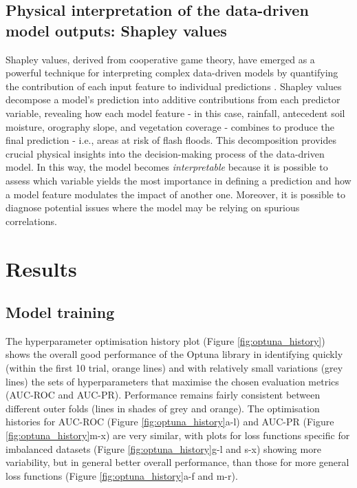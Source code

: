 \subsection{Physical interpretation of the data-driven model outputs: Shapley values}

Shapley values, derived from cooperative game theory, have emerged as a powerful technique for interpreting complex data-driven models by quantifying the contribution of each input feature to individual predictions \citep{Rozemberczki_2022}. Shapley values decompose a model's prediction into additive contributions from each predictor variable, revealing how each model feature - in this case, rainfall, antecedent soil moisture, orography slope, and vegetation coverage - combines to produce the final prediction - i.e., areas at risk of flash floods. This decomposition provides crucial physical insights into the decision-making process of the data-driven model. In this way, the model becomes \textit{interpretable} because it is possible to assess which variable yields the most importance in defining a prediction and how a model feature modulates the impact of another one. Moreover, it is possible to diagnose potential issues where the model may be relying on spurious correlations.  


\section{Results}
\label{data_driven_flash_floods_short_medium_range_results}

\subsection{Model training}

The  hyperparameter optimisation history plot (Figure \ref{fig:optuna_history}) shows the overall good performance of the Optuna library in identifying quickly (within the first 10 trial, orange lines) and with relatively small variations (grey lines) the sets of hyperparameters that maximise the chosen evaluation metrics (AUC-ROC and AUC-PR). Performance remains fairly consistent between different outer folds (lines in shades of grey and orange). The optimisation histories for AUC-ROC (Figure \ref{fig:optuna_history}a-l) and AUC-PR (Figure \ref{fig:optuna_history}m-x) are very similar, with plots for loss functions specific for imbalanced datasets (Figure \ref{fig:optuna_history}g-l and s-x) showing more variability, but in general better overall performance, than those for more general loss functions (Figure \ref{fig:optuna_history}a-f and m-r). 

